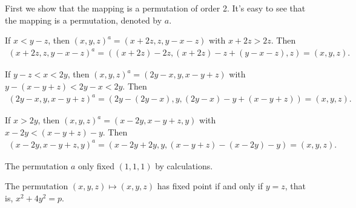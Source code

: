 \documentclass[12pt]{amsart}
\def\pf{\noindent {\it Proof.\ }}
\begin{document}
\pf First we show that the mapping is a permutation of order 2. It's easy to see that the mapping is a permutation, denoted by $a$.

If $x<y-z$, then $(x,y,z)^a=(x+2z,z,y-x-z)$ with $x+2z>2z$. Then 
\begin{align*}
(x+2z,z,y-x-z)^a=((x+2z)-2z,(x+2z)-z+(y-x-z),z)=(x,y,z).
\end{align*}

If $y-z<x<2y$, then $(x,y,z)^a=(2y-x,y,x-y+z)$ with $y-(x-y+z)<2y-x<2y$. Then
\begin{align*}
(2y-x,y,x-y+z)^a=(2y-(2y-x),y,(2y-x)-y+(x-y+z))=(x,y,z).
\end{align*}

If $x>2y$, then $(x,y,z)^a=(x-2y,x-y+z,y)$ with $x-2y<(x-y+z)-y$. Then
\begin{align*}
(x-2y,x-y+z,y)^a=(x-2y+2y,y,(x-y+z)-(x-2y)-y)=(x,y,z).
\end{align*}

The permutation $a$ only fixed $(1,1,1)$ by calculations.

The permutation $(x,y,z)\mapsto (x,y,z)$ has fixed point if and only if $y=z$, that is, $x^2+4y^2=p$.
\end{document}
